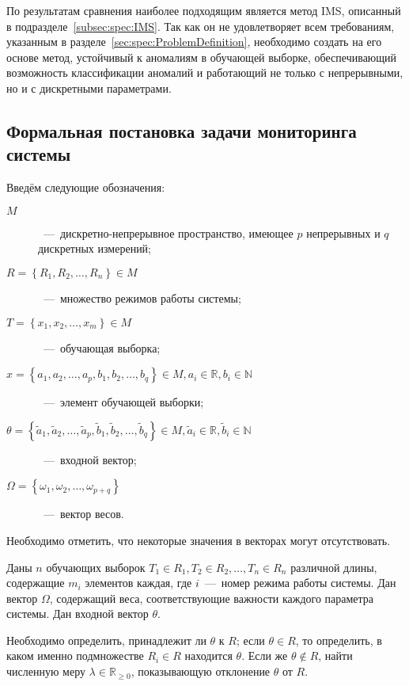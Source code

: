 По результатам сравнения наиболее подходящим является метод IMS, описанный в подразделе~\ref{subsec:spec:IMS}. Так как он не удовлетворяет всем требованиям, указанным в разделе~\ref{sec:spec:ProblemDefinition}, необходимо создать на его основе метод, устойчивый к аномалиям в обучающей выборке, обеспечивающий возможность классификации аномалий и работающий не только с непрерывными, но и с дискретными параметрами.

\subsection{Формальная постановка задачи мониторинга системы}
\label{subsec:spec:DDMS:FormalTask}
Введём следующие обозначения:
\begin{description}
	\item[$M$]~---~дискретно-непрерывное пространство, имеющее $p$ непрерывных и $q$ дискретных измерений;
	\item[$R=\left\{R_1,R_2,\dots,R_n\right\} \in M$]~---~множество режимов работы системы;
	\item[$T=\left\{x_1,x_2,\dots,x_m\right\} \in M$]~---~обучающая выборка;
	\item[$x=\left\{a_1,a_2,\dots,a_p,b_1,b_2,\dots,b_q\right\} \in M, a_i\in\mathbb{R}, b_i\in\mathbb{N}$]~---~элемент обучающей выборки;
	\item[$\theta=\left\{\tilde{a}_1,\tilde{a}_2,\dots,\tilde{a}_p,\tilde{b}_1,\tilde{b}_2,\dots,\tilde{b}_q\right\} \in M, \tilde{a}_i\in\mathbb{R}, \tilde{b}_i\in\mathbb{N}$]~---~входной вектор;
	\item[$\Omega=\left\{\omega_1,\omega_2,\dots,\omega_{p+q}\right\}$]~---~вектор весов.
\end{description}

Необходимо отметить, что некоторые значения в векторах могут отсутствовать.

Даны $n$ обучающих выборок $T_1\in R_1, T_2\in R_2,\dots, T_n\in R_n$ различной длины, содержащие $m_i$ элементов каждая, где $i$~---~номер режима работы системы. Дан вектор $\Omega$, содержащий веса, соответствующие важности каждого параметра системы. Дан входной вектор $\theta$.

Необходимо определить, принадлежит ли $\theta$ к $R$; если $\theta \in R$, то определить, в каком именно подмножестве $R_i\in R$ находится $\theta$. Если же $\theta \notin R$, найти численную меру $\lambda \in \mathbb{R}_{\geq 0}$, показывающую отклонение $\theta$ от $R$.

